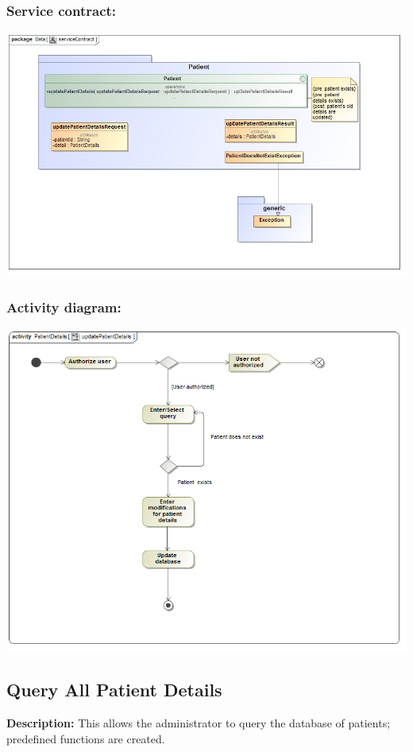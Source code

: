 \subsubsection{Service contract:}
\includegraphics[width=1\linewidth]{./Graphics/2.jpg}
\subsubsection{Activity diagram:}
\includegraphics[width=1\linewidth]{./Graphics/updatePatientDetails.png}

\subsection{Query All Patient Details}
\textbf{Description:}
This allows the administrator to query the database of patients; predefined functions are created.
